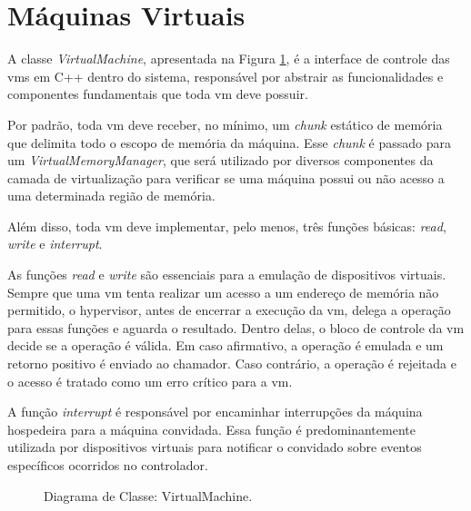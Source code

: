 \section{Máquinas Virtuais}

A classe \textit{VirtualMachine}, apresentada na Figura \ref{fig:class-virtual-machine}, é a interface de controle das \glspl{vm} em C++ dentro do sistema, responsável por abstrair
as funcionalidades e componentes fundamentais que toda \gls{vm} deve possuir.

Por padrão, toda \gls{vm} deve receber, no mínimo, um \textit{chunk} estático de memória que delimita todo o escopo de memória da
máquina. Esse \textit{chunk} é passado para um \textit{VirtualMemoryManager}, que será utilizado por diversos componentes da
camada de virtualização para verificar se uma máquina possui ou não acesso a uma determinada região de memória.

Além disso, toda \gls{vm} deve implementar, pelo menos, três funções básicas: \textit{read}, \textit{write} e \textit{interrupt}.

As funções \textit{read} e \textit{write} são essenciais para a emulação de dispositivos virtuais. Sempre que uma \gls{vm}
tenta realizar um acesso a um endereço de memória não permitido, o hypervisor, antes de encerrar a execução da \gls{vm},
delega a operação para essas funções e aguarda o resultado. Dentro delas, o bloco de controle da \gls{vm} decide se a operação é
válida. Em caso afirmativo, a operação é emulada e um retorno positivo é enviado ao chamador. Caso contrário, a operação é rejeitada e
o acesso é tratado como um erro crítico para a \gls{vm}.

A função \textit{interrupt} é responsável por encaminhar interrupções da máquina hospedeira para a máquina convidada.
Essa função é predominantemente utilizada por dispositivos virtuais para notificar o convidado sobre eventos específicos ocorridos
no controlador.


\begin{figure}[h]
	\centering
	\caption{Diagrama de Classe: VirtualMachine.}
	\label{fig:class-virtual-machine}
\end{figure}

